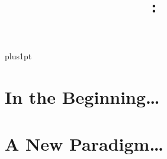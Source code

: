 \documentclass[11pt, openany]{Latex/Classes/PhDthesisPSnPDF}
\title{\MakeUppercase{\MyTitle}}
\title{\MakeUppercase{\MyTitle}: \\ \small{\MySubTitle}}
\author{\href{mailto:\MyEmail}{\Me}}
\author{\Me}
\begin{document}

\renewcommand\baselinestretch{1.2}
\baselineskip=18pt plus1pt


\maketitle  %
\makecopyright %








\setcounter{secnumdepth}{3} %
\setcounter{tocdepth}{3}    %
\tableofcontents            %



\listoftables  %
\listoffigures	%





\mainmatter

	

\part{In the Beginning\ldots}

		
			
\part{A New Paradigm\ldots}
\end{document}
